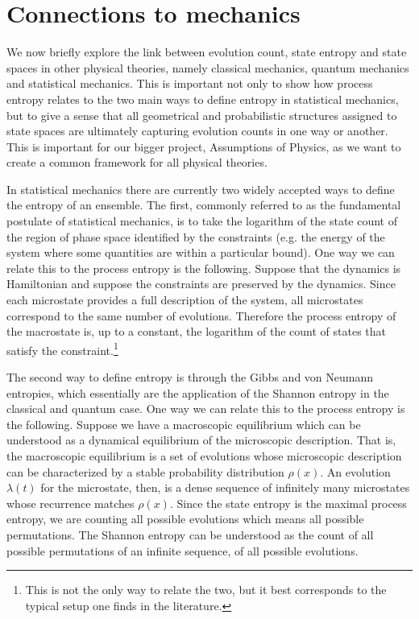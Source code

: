 \documentclass[letterpaper,twocolumn]{article}
\begin{document}
\section{Connections to mechanics}\label{sec_mechanics}

We now briefly explore the link between evolution count, state entropy and state spaces in other physical theories, namely classical mechanics, quantum mechanics and statistical mechanics. This is important not only to show how process entropy relates to the two main ways to define entropy in statistical mechanics, but to give a sense that all geometrical and probabilistic structures assigned to state spaces are ultimately capturing evolution counts in one way or another. This is important for our bigger project, Assumptions of Physics, as we want to create a common framework for all physical theories.

In statistical mechanics there are currently two widely accepted ways to define the entropy of an ensemble. The first, commonly referred to as the fundamental postulate of statistical mechanics, is to take the logarithm of the state count of the region of phase space identified by the constraints (e.g. the energy of the system where some quantities are within a particular bound). One way we can relate this to the process entropy is the following. Suppose that the dynamics is Hamiltonian and suppose the constraints are preserved by the dynamics. Since each microstate provides a full description of the system, all microstates correspond to the same number of evolutions. Therefore the process entropy of the macrostate is, up to a constant, the logarithm of the count of states that satisfy the constraint.\footnote{This is not the only way to relate the two, but it best corresponds to the typical setup one finds in the literature.}

The second way to define entropy is through the Gibbs and von Neumann entropies, which essentially are the application of the Shannon entropy in the classical and quantum case. One way we can relate this to the process entropy is the following. Suppose we have a macroscopic equilibrium which can be understood as a dynamical equilibrium of the microscopic description. That is, the macroscopic equilibrium is a set of evolutions whose microscopic description can be characterized by a stable probability distribution $\rho(x)$. An evolution $\lambda(t)$ for the microstate, then, is a dense sequence of infinitely many microstates whose recurrence matches $\rho(x)$. Since the state entropy is the maximal process entropy, we are counting all possible evolutions which means all possible permutations. The Shannon entropy can be understood as the count of all possible permutations of an infinite sequence, of all possible evolutions.
\end{document}
